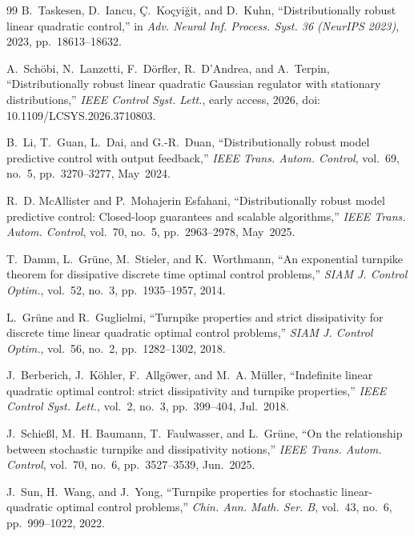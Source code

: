 \documentclass[10pt,journal,twoside]{IEEEtran}
\theoremstyle{definition}
\theoremstyle{remark}
\begin{document}
\begin{thebibliography}{99}
B.~Taskesen, D.~Iancu, {\c C}.~Ko{\c c}yi{\u g}it, and D.~Kuhn,
\newblock ``Distributionally robust linear quadratic control,''
\newblock in \emph{Adv. Neural Inf. Process. Syst. 36 (NeurIPS 2023)},
2023, pp.~18613--18632.

A.~Sch{\"o}bi, N.~Lanzetti, F.~D{\"o}rfler, R.~D'Andrea, and A.~Terpin,
\newblock ``Distributionally robust linear quadratic Gaussian regulator
with stationary distributions,''
\newblock \emph{IEEE Control Syst. Lett.}, early access, 2026,
doi: 10.1109/LCSYS.2026.3710803.

B.~Li, T.~Guan, L.~Dai, and G.-R.~Duan,
\newblock ``Distributionally robust model predictive control with output
feedback,''
\newblock \emph{IEEE Trans. Autom. Control}, vol.~69, no.~5,
pp.~3270--3277, May~2024.

R.~D. McAllister and P.~Mohajerin Esfahani,
\newblock ``Distributionally robust model predictive control: Closed-loop
guarantees and scalable algorithms,''
\newblock \emph{IEEE Trans. Autom. Control}, vol.~70, no.~5,
pp.~2963--2978, May~2025.

T.~Damm, L.~Gr{\"u}ne, M.~Stieler, and K.~Worthmann,
\newblock ``An exponential turnpike theorem for dissipative discrete time
optimal control problems,''
\newblock \emph{SIAM J. Control Optim.}, vol.~52, no.~3,
pp.~1935--1957, 2014.

L.~Gr{\"u}ne and R.~Guglielmi,
\newblock ``Turnpike properties and strict dissipativity for discrete time
linear quadratic optimal control problems,''
\newblock \emph{SIAM J. Control Optim.}, vol.~56, no.~2,
pp.~1282--1302, 2018.

J.~Berberich, J.~K{\"o}hler, F.~Allg{\"o}wer, and M.~A. M{\"u}ller,
\newblock ``Indefinite linear quadratic optimal control: strict
dissipativity and turnpike properties,''
\newblock \emph{IEEE Control Syst. Lett.}, vol.~2, no.~3,
pp.~399--404, Jul.~2018.

J.~Schie{\ss}l, M.~H. Baumann, T.~Faulwasser, and L.~Gr{\"u}ne,
\newblock ``On the relationship between stochastic turnpike and
dissipativity notions,''
\newblock \emph{IEEE Trans. Autom. Control}, vol.~70, no.~6,
pp.~3527--3539, Jun.~2025.

J.~Sun, H.~Wang, and J.~Yong,
\newblock ``Turnpike properties for stochastic linear-quadratic optimal
control problems,''
\newblock \emph{Chin. Ann. Math. Ser. B}, vol.~43, no.~6,
pp.~999--1022, 2022.


\end{thebibliography}
\end{document}
